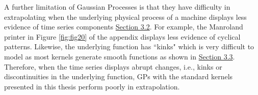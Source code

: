 A further limitation of Gaussian Processes is that they have difficulty in extrapolating when the underlying physical process of a machine displays less evidence of time series components \hyperlink{subsection.3.2}{Section 3.2}. For example, the Manroland printer in Figure \ref{fig:fig20} of the appendix displays less evidence of cyclical patterns. Likewise, the underlying function has ``kinks" which is very difficult to model as most kernels generate smooth functions as shown in \hyperlink{subsection.3.3}{Section 3.3}. Therefore, when the time series displays abrupt changes, i.e., kinks or discontinuities in the underlying function, GPs with the standard kernels presented in this thesis perform poorly in extrapolation. 